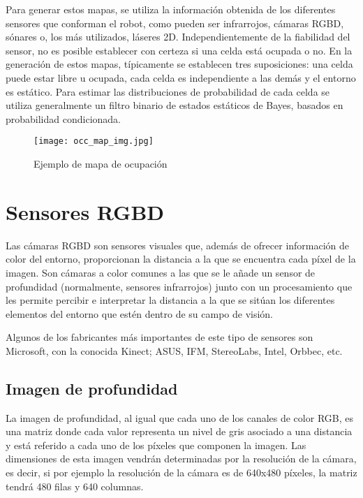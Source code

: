 Para generar estos mapas, se utiliza la información obtenida de los diferentes sensores que conforman el robot, como pueden ser infrarrojos, cámaras RGBD, sónares o, los más utilizados, láseres 2D. Independientemente de la fiabilidad del sensor, no es posible establecer con certeza si una celda está ocupada o no. En la generación de estos mapas, típicamente se establecen tres suposiciones: una celda puede estar libre u ocupada, cada celda es independiente a las demás y el entorno es estático. Para estimar las distribuciones de probabilidad de cada celda se utiliza generalmente un filtro binario de estados estáticos de Bayes, basados en probabilidad condicionada.\\

\begin{figure}[h]
\begin{center} \label{fig:occ_map}
\texttt{[image: occ\_map\_img.jpg]}
\end{center}
\caption{Ejemplo de mapa de ocupación}
\end{figure}

\section{Sensores RGBD}

Las cámaras RGBD son sensores visuales que, además de ofrecer información de color del entorno, proporcionan la distancia a la que se encuentra cada píxel de la imagen. Son cámaras a color comunes a las que se le añade un sensor de profundidad (normalmente, sensores infrarrojos) junto con un procesamiento que les permite percibir e interpretar la distancia a la que se sitúan los diferentes elementos del entorno que estén dentro de su campo de visión.\\


Algunos de los fabricantes más importantes de este tipo de sensores son Microsoft, con la conocida Kinect; ASUS, IFM, StereoLabs, Intel, Orbbec, etc.\\

\subsection{Imagen de profundidad}

La imagen de profundidad, al igual que cada uno de los canales de color RGB, es una matriz donde cada valor representa un nivel de gris asociado a una distancia y está referido a cada uno de los píxeles que componen la imagen. Las dimensiones de esta imagen vendrán determinadas por la resolución de la cámara, es decir, si por ejemplo la resolución de la cámara es de 640x480 píxeles, la matriz tendrá 480 filas y 640 columnas. \\

